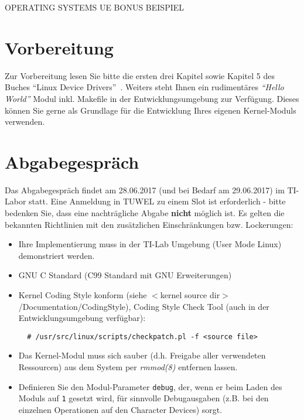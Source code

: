 \documentclass{article}
\begin{document}
\begin{center}
\begin{Large}
OPERATING SYSTEMS UE BONUS BEISPIEL
\end{Large}
\end{center}


\section*{Vorbereitung}
Zur Vorbereitung lesen Sie bitte die ersten drei Kapitel sowie Kapitel
5 des Buches "`Linux Device
Drivers"'~\cite{Corbet:2005:LDD:1209083}. Weiters steht Ihnen ein
rudiment{\"a}res \emph{"`Hello World"'} Modul inkl. Makefile in
der Entwicklungsumgebung zur Verf{\"u}gung. Dieses k{\"o}nnen Sie gerne als
Grundlage f{\"u}r die Entwicklung Ihres eigenen Kernel-Moduls
verwenden.

\section*{Abgabegespr{\"a}ch}
Das Abgabegespr{\"a}ch findet am 28.06.2017 (und bei Bedarf am 29.06.2017) im TI-Labor statt.
Eine Anmeldung in TUWEL zu einem Slot ist erforderlich -
bitte bedenken Sie, dass eine nachtr{\"a}gliche Abgabe {\bf nicht}
m{\"o}glich ist. Es gelten die
bekannten Richtlinien mit den zus{\"a}tzlichen Einschr{\"a}nkungen
bzw. Lockerungen:
\begin{itemize}
\item Ihre Implementierung muss in der TI-Lab Umgebung (User Mode Linux) demonstriert werden.
\item GNU C Standard (C99 Standard mit GNU Erweiterungen)
\item Kernel Coding Style konform (siehe $<$kernel source
  dir$>$/Documentation/CodingStyle), Coding Style Check Tool
  (auch in der Entwicklungsumgebung verf{\"u}gbar):
  \begin{verbatim}
  # /usr/src/linux/scripts/checkpatch.pl -f <source file>
  \end{verbatim}
\item Das Kernel-Modul muss sich sauber (d.h. Freigabe aller
  verwendeten Ressourcen) aus dem System per \emph{rmmod(8)} entfernen lassen.
\item Definieren Sie den Modul-Parameter \verb|debug|, der, wenn er beim Laden des Moduls auf \texttt{1} gesetzt wird, f{\"u}r sinnvolle Debugausgaben (z.B. bei den einzelnen Operationen auf den Character Devices) sorgt.
\end{itemize}
\end{document}
